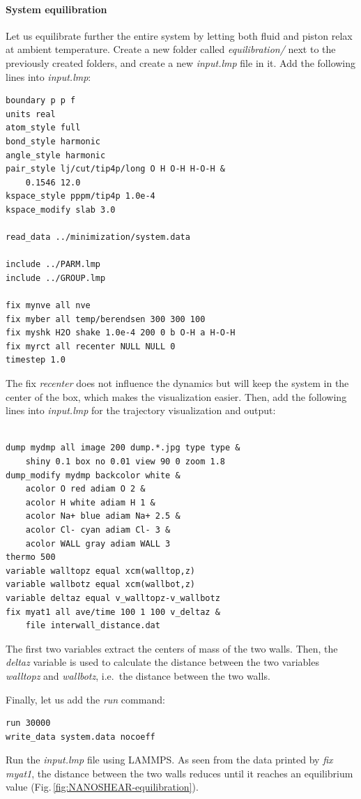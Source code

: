 \documentclass[9pt,tutorial]{livecoms}
\begin{document}
\paragraph{System equilibration}
Let us equilibrate further the entire system by letting both fluid and piston
relax at ambient temperature. Create a new folder called \textit{equilibration/}
next to the previously created folders, and create a new \textit{input.lmp}
file in it. Add the following lines into \textit{input.lmp}:
{\normalsize \begin{verbatim}
boundary p p f
units real
atom_style full
bond_style harmonic
angle_style harmonic
pair_style lj/cut/tip4p/long O H O-H H-O-H &
    0.1546 12.0
kspace_style pppm/tip4p 1.0e-4
kspace_modify slab 3.0

read_data ../minimization/system.data

include ../PARM.lmp
include ../GROUP.lmp

fix mynve all nve
fix myber all temp/berendsen 300 300 100
fix myshk H2O shake 1.0e-4 200 0 b O-H a H-O-H
fix myrct all recenter NULL NULL 0
timestep 1.0
\end{verbatim}}
The fix \textit{recenter} does not influence the dynamics but will keep the
system in the center of the box, which makes the
visualization easier. Then, add the following lines into \textit{input.lmp}
for the trajectory visualization and output:
{\normalsize \begin{verbatim}

dump mydmp all image 200 dump.*.jpg type type &
    shiny 0.1 box no 0.01 view 90 0 zoom 1.8
dump_modify mydmp backcolor white &
    acolor O red adiam O 2 &
    acolor H white adiam H 1 &
    acolor Na+ blue adiam Na+ 2.5 &
    acolor Cl- cyan adiam Cl- 3 &
    acolor WALL gray adiam WALL 3
thermo 500
variable walltopz equal xcm(walltop,z)
variable wallbotz equal xcm(wallbot,z)
variable deltaz equal v_walltopz-v_wallbotz
fix myat1 all ave/time 100 1 100 v_deltaz &
    file interwall_distance.dat
\end{verbatim}}
The first two variables extract the centers of mass of the two walls. Then,
the \textit{deltaz} variable is used to calculate the distance between the two
variables \textit{walltopz} and \textit{wallbotz}, i.e.~the distance between the two walls.

Finally, let us add the \textit{run} command:
{\normalsize \begin{verbatim}
run 30000
write_data system.data nocoeff
\end{verbatim}}
Run the \textit{input.lmp} file using LAMMPS. As seen from the data printed by
\textit{fix myat1}, the distance between the two walls reduces until it reaches
an equilibrium value (Fig.\,\ref{fig:NANOSHEAR-equilibration}).
\end{document}
